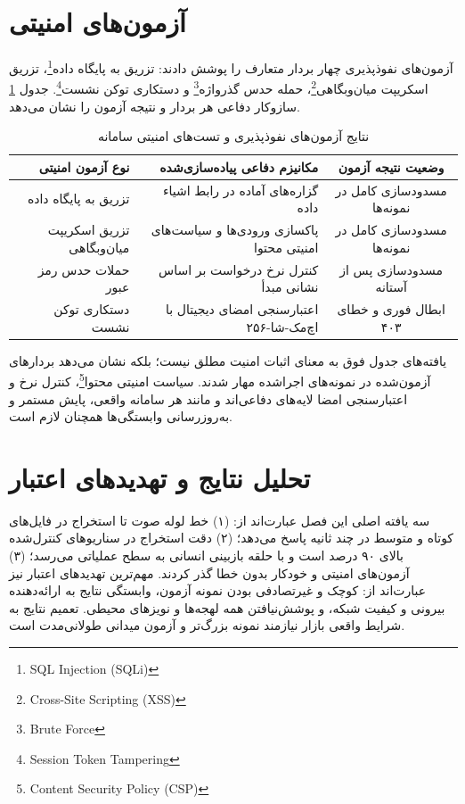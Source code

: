 \documentclass[11pt, a4paper]{report}
\makeatletter
\let\amlak@hline\hline
\newcommand{\enfootnote}[1]{\footnote{\foreignlanguage{english}{#1}}}
\let\hline\amlak@hline
\makeatother
\begin{document}
\section{آزمون‌های امنیتی}
آزمون‌های نفوذپذیری چهار بردار متعارف را پوشش دادند: تزریق به پایگاه داده\enfootnote{SQL Injection (SQLi)}، تزریق اسکریپت میان‌وبگاهی\enfootnote{Cross-Site Scripting (XSS)}، حمله حدس گذرواژه\enfootnote{Brute Force} و دستکاری توکن نشست\enfootnote{Session Token Tampering}. جدول \ref{tab:sec_eval} سازوکار دفاعی هر بردار و نتیجه آزمون را نشان می‌دهد.

\begin{table}[htbp]
\centering
\caption{نتایج آزمون‌های نفوذپذیری و تست‌های امنیتی سامانه}
\label{tab:sec_eval}
\renewcommand{\arraystretch}{1.5}
\begin{tabular}{|r|r|c|}
\hline
\textbf{نوع آزمون امنیتی} & \textbf{مکانیزم دفاعی پیاده‌سازی‌شده} & \textbf{وضعیت نتیجه آزمون} \\ \hline
تزریق به پایگاه داده & گزاره‌های آماده در رابط اشیاء داده & مسدودسازی کامل در نمونه‌ها \\ \hline
تزریق اسکریپت میان‌وبگاهی & پاکسازی ورودی‌ها و سیاست‌های امنیتی محتوا & مسدودسازی کامل در نمونه‌ها \\ \hline
حملات حدس رمز عبور & کنترل نرخ درخواست بر اساس نشانی مبدأ & مسدودسازی پس از آستانه \\ \hline
دستکاری توکن نشست & اعتبارسنجی امضای دیجیتال با اچ‌مک-شا-۲۵۶ & ابطال فوری و خطای ۴۰۳ \\ \hline
\end{tabular}
\end{table}

یافته‌های جدول فوق به معنای اثبات امنیت مطلق نیست؛ بلکه نشان می‌دهد بردارهای آزمون‌شده در نمونه‌های اجرا‌شده مهار شدند. سیاست امنیتی محتوا\enfootnote{Content Security Policy (CSP)}، کنترل نرخ و اعتبارسنجی امضا لایه‌های دفاعی‌اند و مانند هر سامانه واقعی، پایش مستمر و به‌روزرسانی وابستگی‌ها همچنان لازم است.

\section{تحلیل نتایج و تهدیدهای اعتبار}
سه یافته اصلی این فصل عبارت‌اند از: (۱) خط لوله صوت تا استخراج در فایل‌های کوتاه و متوسط در چند ثانیه پاسخ می‌دهد؛ (۲) دقت استخراج در سناریوهای کنترل‌شده بالای ۹۰ درصد است و با حلقه بازبینی انسانی به سطح عملیاتی می‌رسد؛ (۳) آزمون‌های امنیتی و خودکار بدون خطا گذر کردند. مهم‌ترین تهدیدهای اعتبار نیز عبارت‌اند از: کوچک و غیرتصادفی بودن نمونه آزمون، وابستگی نتایج به ارائه‌دهنده بیرونی و کیفیت شبکه، و پوشش‌نیافتن همه لهجه‌ها و نویزهای محیطی. تعمیم نتایج به شرایط واقعی بازار نیازمند نمونه بزرگ‌تر و آزمون میدانی طولانی‌مدت است.
\end{document}
